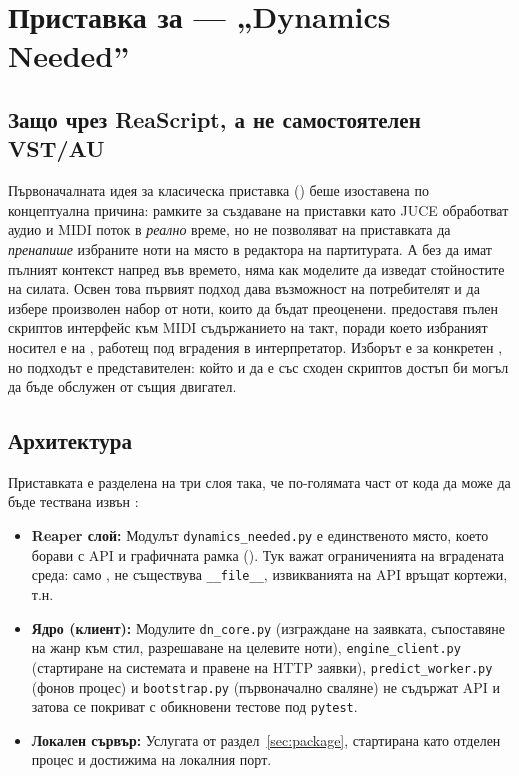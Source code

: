 \section{Приставка за  — „Dynamics Needed''}
\label{sec:reaper}

\subsection{Защо чрез ReaScript, а не самостоятелен VST/AU}
\label{sec:why-reascript}

Първоначалната идея за класическа приставка () беше изоставена по
концептуална причина: рамките за създаване на приставки като JUCE обработват
аудио и MIDI поток в \emph{реално} време, но не позволяват на приставката да \emph{пренапише}
избраните ноти на място в редактора на партитурата. А без да имат пълният контекст напред във времето,
няма как моделите да изведат стойностите на силата. Освен това първият подход дава възможност на потребителят
и да избере произволен набор от ноти, които да бъдат преоценени.
 предоставя пълен скриптов интерфейс към
MIDI съдържанието на такт, поради което избраният носител е
 на , работещ под вградения в  интерпретатор.
Изборът е за конкретен , но подходът е представителен: който и да е
 със сходен скриптов достъп би могъл да бъде обслужен от същия двигател.

\subsection{Архитектура}
\label{sec:reaper-arch}

Приставката е разделена на три слоя така, че по-голямата част от кода да може да бъде
тествана извън :
\begin{itemize}
  \item \textbf{Reaper слой:} Модулът \texttt{dynamics\_needed.py} е
        единственото място, което борави с  API и графичната рамка
        (). Тук важат ограниченията на вградената среда: само
        , не съществува \texttt{\_\_file\_\_}, извикванията на  API
        връщат кортежи, т.н.
  \item \textbf{Ядро (клиент):} Модулите \texttt{dn\_\allowbreak core.py} (изграждане на
        заявката, съпоставяне на жанр към стил, разрешаване на целевите ноти),
        \texttt{engine\_\allowbreak client.py} (стартиране на системата и правене на HTTP заявки),
        \texttt{predict\_\allowbreak worker.py} (фонов процес) и \texttt{boot\allowbreak strap.py}
        (първоначално сваляне) не съдържат  API и затова се покриват с
        обикновени  тестове под \texttt{pytest}.
  \item \textbf{Локален сървър:} Услугата от раздел~\ref{sec:package}, стартирана
        като отделен процес и достижима на локалния порт.
\end{itemize}

